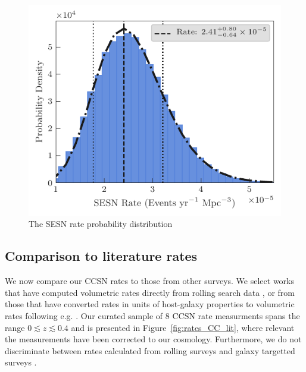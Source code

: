 \documentclass[a4paper,fleqn,usenatbib]{mnras}
\begin{document}
\begin{figure}
	\includegraphics[width=\linewidth]{./SESN_Rate.pdf}
    \caption{The SESN rate probability distribution}
    \label{fig:SESNrateProbDist}
\end{figure}

\subsection{Comparison to literature rates}

We now compare our CCSN rates to those from other surveys. We select works that have computed volumetric rates directly from rolling search data \citep[e.g.][]{2009A&A...499..653B}, or from those that have converted rates in units of host-galaxy properties to volumetric rates following e.g. \citet{2008A&A...479...49B}. Our curated sample of 8 CCSN rate measurments spans the range $0\lesssim z \lesssim 0.4$ and is presented in Figure~\ref{fig:rates_CC_lit}, where relevant the measurements have been corrected to our cosmology. Furthermore, we do not discriminate between rates calculated from rolling surveys \citep[e.g.][]{2009A&A...499..653B} and galaxy targetted surveys \citep[e.g.][]{1999A&A...351..459C}.
\end{document}
